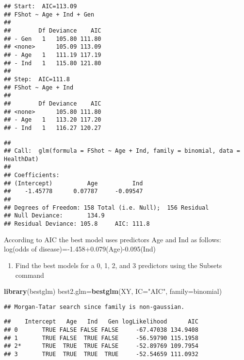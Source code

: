 \documentclass[]{article}
\newenvironment{Shaded}{\begin{snugshade}}{\end{snugshade}}
\newcommand{\KeywordTok}[1]{\textcolor[rgb]{0.13,0.29,0.53}{\textbf{#1}}}
\newcommand{\DataTypeTok}[1]{\textcolor[rgb]{0.13,0.29,0.53}{#1}}
\newcommand{\StringTok}[1]{\textcolor[rgb]{0.31,0.60,0.02}{#1}}
\newcommand{\OperatorTok}[1]{\textcolor[rgb]{0.81,0.36,0.00}{\textbf{#1}}}
\newcommand{\NormalTok}[1]{#1}
\providecommand{\tightlist}{%
  \setlength{\itemsep}{0pt}\setlength{\parskip}{0pt}}
\begin{document}
\begin{verbatim}
## Start:  AIC=113.09
## FShot ~ Age + Ind + Gen
## 
##        Df Deviance    AIC
## - Gen   1   105.80 111.80
## <none>      105.09 113.09
## - Age   1   111.19 117.19
## - Ind   1   115.80 121.80
## 
## Step:  AIC=111.8
## FShot ~ Age + Ind
## 
##        Df Deviance    AIC
## <none>      105.80 111.80
## - Age   1   113.20 117.20
## - Ind   1   116.27 120.27
\end{verbatim}

\begin{verbatim}
## 
## Call:  glm(formula = FShot ~ Age + Ind, family = binomial, data = HealthDat)
## 
## Coefficients:
## (Intercept)          Age          Ind  
##    -1.45778      0.07787     -0.09547  
## 
## Degrees of Freedom: 158 Total (i.e. Null);  156 Residual
## Null Deviance:       134.9 
## Residual Deviance: 105.8     AIC: 111.8
\end{verbatim}

According to AIC the best model uses predictors Age and Ind as follows:
log(odds of disease)=-1.458+0.079(Age)-0.095(Ind)

\begin{enumerate}
\def\labelenumi{\roman{enumi})}
\setcounter{enumi}{3}
\tightlist
\item
  Find the best models for a 0, 1, 2, and 3 predictors using the Subsets
  command
\end{enumerate}

\begin{Shaded}
\begin{Highlighting}[]
\KeywordTok{library}\NormalTok{(bestglm)}
\NormalTok{best2.glm=}\KeywordTok{bestglm}\NormalTok{(XY, }\DataTypeTok{IC=}\StringTok{"AIC"}\NormalTok{, }\DataTypeTok{family=}\NormalTok{binomial)}
\end{Highlighting}
\end{Shaded}

\begin{verbatim}
## Morgan-Tatar search since family is non-gaussian.
\end{verbatim}

\begin{Shaded}
\end{Shaded}

\begin{verbatim}
##    Intercept   Age   Ind   Gen logLikelihood      AIC
## 0       TRUE FALSE FALSE FALSE     -67.47038 134.9408
## 1       TRUE FALSE  TRUE FALSE     -56.59790 115.1958
## 2*      TRUE  TRUE  TRUE FALSE     -52.89769 109.7954
## 3       TRUE  TRUE  TRUE  TRUE     -52.54659 111.0932
\end{verbatim}
\end{document}
